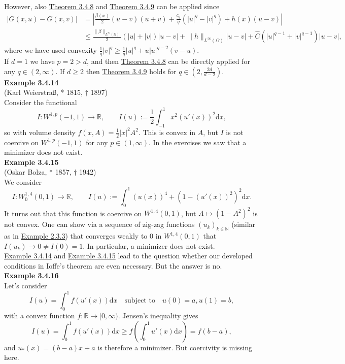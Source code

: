 However, also \hyperlink{theorem_3_4_8}{Theorem 3.4.8} and \hyperlink{theorem_3_4_9}{Theorem 3.4.9} can be applied since
\begin{align*}
	\lvert G(x,u)-G(x,v)\rvert&=\left\lvert\frac{\beta(x)}{2}(u-v)(u+v)+\frac{c_q}{q}(\lvert u\rvert^q-\lvert v\rvert^q)+h(x)(u-v)\right\rvert\\
	&\leq\frac{\lVert\beta\rVert_{L^\infty(\Omega)}}{2}(\lvert u\rvert+\lvert v\rvert)\lvert u-v\rvert+\lVert h\rVert_{L^\infty(\Omega)}\lvert u-v\rvert+\widehat{C}\left(\lvert u\rvert^{q-1}+\lvert v\rvert^{q-1}\right)\lvert u-v\rvert,
\end{align*}
where we have used convexity $\frac{1}{q}\lvert v\rvert^q\geq\frac{1}{q}\lvert u\rvert^q+u\lvert u\rvert^{q-2}(v-u)$.\\

If $d=1$ we have $p=2>d$, and then \hyperlink{theorem_3_4_8}{Theorem 3.4.8} can be directly applied for any $q\in(2,\infty)$. If $d\geq2$ then \hyperlink{theorem_3_4_9}{Theorem 3.4.9} holds for $q\in(2,\frac{2d}{d-2})$.\\[11pt]

\hypertarget{example_3_4_14}{\textbf{Example 3.4.14}}\\
(Karl Weierstra{\ss}, * 1815, $\dagger$ 1897)\\
Consider the functional
\[I:W^{1,p}(-1,1)\longrightarrow\mathbb{R},\qquad I(u):=\frac{1}{2}\int_{-1}^1{x^2(u'(x))^2\mathrm{d}x},\]
so with volume density $f(x,A)=\frac{1}{2}\lvert x\rvert^2A^2$. This is convex in $A$, but $I$ is not coercive on $W^{1,p}(-1,1)$ for any $p\in(1,\infty)$. In the exercises we saw that a minimizer does not exist.\\[11pt]

\hypertarget{example_3_4_15}{\textbf{Example 3.4.15}}\\
(Oskar Bolza, * 1857, $\dagger$ 1942)\\
We consider
\[I:W_0^{1,4}(0,1)\longrightarrow\mathbb{R},\qquad I(u):=\int_0^1{(u(x))^4+(1-(u'(x))^2)^2\mathrm{d}x}.\]
It turns out that this function is coercive on $W^{1,4}(0,1)$, but $A\longmapsto(1-A^2)^2$ is not convex. One can show via a sequence of zig-zag functions $(u_k)_{k\in\mathbb{N}}$ (similar as in \hyperlink{example_2_3_3}{Example 2.3.3}) that converges weakly to 0 in $W^{1,4}(0,1)$ that $I(u_k)\to0\ne I(0)=1$. In particular, a minimizer does not exist.\\[11pt]

\hyperlink{example_3_4_14}{Example 3.4.14} and \hyperlink{example_3_4_15}{Example 3.4.15} lead to the question whether our developed conditions in Ioffe's theorem are even necessary. But the answer is no.\\[11pt]

\textbf{Example 3.4.16}\\
Let's consider
\[I(u)=\int_0^1{f(u'(x))\mathrm{d}x}\quad\text{subject to}\quad u(0)=a,u(1)=b,\]
with a convex function $f:\mathbb{R}\longrightarrow[0,\infty)$. Jensen's inequality gives
\[I(u)=\int_0^1{f(u'(x))\mathrm{d}x}\geq f\left(\int_0^1{u'(x)\mathrm{d}x}\right)=f(b-a),\]
and $u_*(x)=(b-a)x+a$ is therefore a minimizer. But coercivity is missing here.